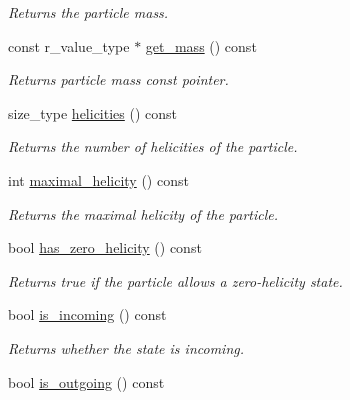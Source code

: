 \begin{DoxyCompactItemize}
\begin{DoxyCompactList}\small\item\em Returns the particle mass. \end{DoxyCompactList}\item 
\hypertarget{a00026_ae37b038b5d6c47e31aeebe829909efe9}{const r\-\_\-value\-\_\-type $\ast$ \hyperlink{a00026_ae37b038b5d6c47e31aeebe829909efe9}{get\-\_\-mass} () const }\label{a00026_ae37b038b5d6c47e31aeebe829909efe9}

\begin{DoxyCompactList}\small\item\em Returns particle mass const pointer. \end{DoxyCompactList}\item 
\hypertarget{a00026_a9b2f7518fa30de51dfd002906939e6f9}{size\-\_\-type \hyperlink{a00026_a9b2f7518fa30de51dfd002906939e6f9}{helicities} () const }\label{a00026_a9b2f7518fa30de51dfd002906939e6f9}

\begin{DoxyCompactList}\small\item\em Returns the number of helicities of the particle. \end{DoxyCompactList}\item 
\hypertarget{a00026_a668beb77a58aac3c8f88124adcbca3fb}{int \hyperlink{a00026_a668beb77a58aac3c8f88124adcbca3fb}{maximal\-\_\-helicity} () const }\label{a00026_a668beb77a58aac3c8f88124adcbca3fb}

\begin{DoxyCompactList}\small\item\em Returns the maximal helicity of the particle. \end{DoxyCompactList}\item 
\hypertarget{a00026_a91f560faec67848752e14f92957c1b65}{bool \hyperlink{a00026_a91f560faec67848752e14f92957c1b65}{has\-\_\-zero\-\_\-helicity} () const }\label{a00026_a91f560faec67848752e14f92957c1b65}

\begin{DoxyCompactList}\small\item\em Returns true if the particle allows a zero-\/helicity state. \end{DoxyCompactList}\item 
\hypertarget{a00026_a9183360f5bb25d8b53cc1da76a2ecff8}{bool \hyperlink{a00026_a9183360f5bb25d8b53cc1da76a2ecff8}{is\-\_\-incoming} () const }\label{a00026_a9183360f5bb25d8b53cc1da76a2ecff8}

\begin{DoxyCompactList}\small\item\em Returns whether the state is incoming. \end{DoxyCompactList}\item 
\hypertarget{a00026_aec434eb8de1fe70624f04bfbb8ce7dc7}{bool \hyperlink{a00026_aec434eb8de1fe70624f04bfbb8ce7dc7}{is\-\_\-outgoing} () const }\label{a00026_aec434eb8de1fe70624f04bfbb8ce7dc7}


\end{DoxyCompactItemize}
